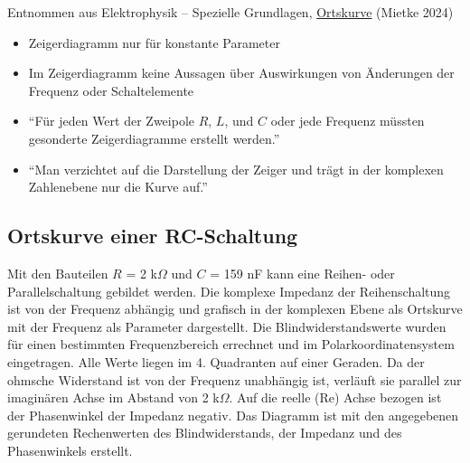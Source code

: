 \documentclass[
  ngerman,
  letterpaper,
]{scrbook}
\begin{document}
Entnommen aus Elektrophysik -- Spezielle Grundlagen,
\href{https://elektroniktutor.de/elektrophysik/ortskurv.html}{Ortskurve}
(Mietke 2024)

\begin{tcolorbox}[enhanced jigsaw, titlerule=0mm, rightrule=.15mm, toprule=.15mm, colback=white, toptitle=1mm, bottomrule=.15mm, coltitle=black, leftrule=.75mm, arc=.35mm, colbacktitle=quarto-callout-note-color!10!white, opacityback=0, bottomtitle=1mm, colframe=quarto-callout-note-color-frame, opacitybacktitle=0.6, breakable, title=\textcolor{quarto-callout-note-color}{\faInfo}\hspace{0.5em}{Vergleich zum Zeigerdiagramm}, left=2mm]

\begin{itemize}
\item
  Zeigerdiagramm nur für konstante Parameter
\item
  Im Zeigerdiagramm keine Aussagen über Auswirkungen von Änderungen der
  Frequenz oder Schaltelemente
\item
  ``Für jeden Wert der Zweipole \(R\), \(L\), und \(C\) oder jede
  Frequenz müssten gesonderte Zeigerdiagramme erstellt werden.''
\item
  ``Man verzichtet auf die Darstellung der Zeiger und trägt in der
  komplexen Zahlenebene nur die Kurve auf.''
\end{itemize}

\end{tcolorbox}

\subsection{Ortskurve einer
RC-Schaltung}\label{ortskurve-einer-rc-schaltung}

Mit den Bauteilen \(R\) = 2 k\(\Omega\) und \(C\) = 159 nF kann eine
Reihen- oder Parallelschaltung gebildet werden. Die komplexe Impedanz
der Reihenschaltung ist von der Frequenz abhängig und grafisch in der
komplexen Ebene als Ortskurve mit der Frequenz als Parameter
dargestellt. Die Blindwiderstandswerte wurden für einen bestimmten
Frequenzbereich errechnet und im Polarkoordinatensystem eingetragen.
Alle Werte liegen im 4. Quadranten auf einer Geraden. Da der ohmsche
Widerstand ist von der Frequenz unabhängig ist, verläuft sie parallel
zur imaginären Achse im Abstand von 2 k\(\Omega\). Auf die reelle (Re)
Achse bezogen ist der Phasenwinkel der Impedanz negativ. Das Diagramm
ist mit den angegebenen gerundeten Rechenwerten des Blindwiderstands,
der Impedanz und des Phasenwinkels erstellt.
\end{document}
